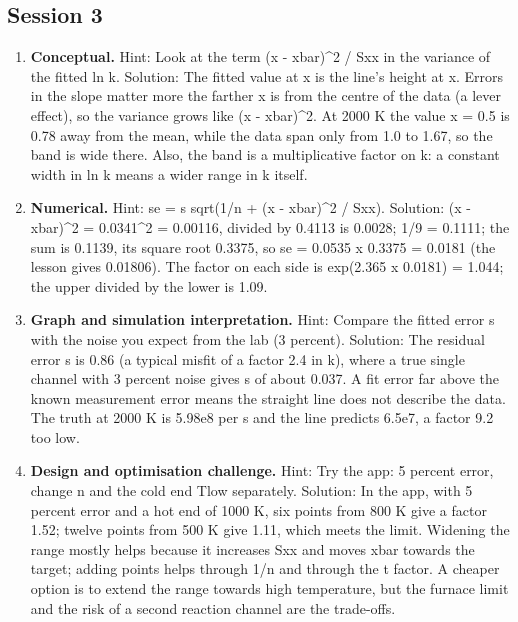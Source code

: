 \documentclass[11pt,a4paper]{article}
\begin{document}
\subsection*{Session 3}
\begin{enumerate}[nosep]
\item \textbf{Conceptual.} Hint: Look at the term (x - xbar)\textasciicircum{}2 / Sxx in the variance of the fitted ln k. Solution: The fitted value at x is the line's height at x. Errors in the slope matter more the farther x is from the centre of the data (a lever effect), so the variance grows like (x - xbar)\textasciicircum{}2. At 2000 K the value x = 0.5 is 0.78 away from the mean, while the data span only from 1.0 to 1.67, so the band is wide there. Also, the band is a multiplicative factor on k: a constant width in ln k means a wider range in k itself.
\item \textbf{Numerical.} Hint: se = s sqrt(1/n + (x - xbar)\textasciicircum{}2 / Sxx). Solution: (x - xbar)\textasciicircum{}2 = 0.0341\textasciicircum{}2 = 0.00116, divided by 0.4113 is 0.0028; 1/9 = 0.1111; the sum is 0.1139, its square root 0.3375, so se = 0.0535 x 0.3375 = 0.0181 (the lesson gives 0.01806). The factor on each side is exp(2.365 x 0.0181) = 1.044; the upper divided by the lower is 1.09.
\item \textbf{Graph and simulation interpretation.} Hint: Compare the fitted error s with the noise you expect from the lab (3 percent). Solution: The residual error s is 0.86 (a typical misfit of a factor 2.4 in k), where a true single channel with 3 percent noise gives s of about 0.037. A fit error far above the known measurement error means the straight line does not describe the data. The truth at 2000 K is 5.98e8 per s and the line predicts 6.5e7, a factor 9.2 too low.
\item \textbf{Design and optimisation challenge.} Hint: Try the app: 5 percent error, change n and the cold end Tlow separately. Solution: In the app, with 5 percent error and a hot end of 1000 K, six points from 800 K give a factor 1.52; twelve points from 500 K give 1.11, which meets the limit. Widening the range mostly helps because it increases Sxx and moves xbar towards the target; adding points helps through 1/n and through the t factor. A cheaper option is to extend the range towards high temperature, but the furnace limit and the risk of a second reaction channel are the trade-offs.
\end{enumerate}
\end{document}
